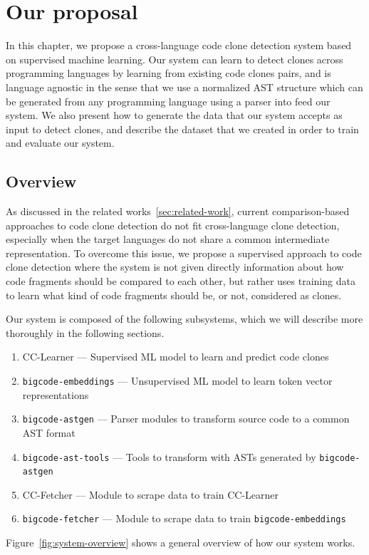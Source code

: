 \chapter{\label{ch:proposal}Our proposal}
In this chapter, we propose a cross-language code clone detection system based
on supervised machine learning. Our system can learn to detect clones across
programming languages by learning from existing code clones pairs, and is
language agnostic in the sense that we use a normalized AST structure which can
be generated from any programming language using a parser into feed our system.
We also present how to generate the data that our system accepts as input to
detect clones, and describe the dataset that we created in order to train and
evaluate our system.
%
\section{\label{sec:proposal-overview}Overview}
As discussed in the related works~\ref{sec:related-work}, current
comparison-based approaches to code clone detection do not fit cross-language
clone detection, especially when the target languages do not share a common
intermediate representation.
To overcome this issue, we propose a supervised approach to code clone detection
where the system is not given directly information about how code fragments
should be compared to each other, but rather uses training data to learn what
kind of code fragments should be, or not, considered as clones.

Our system is composed of the following subsystems, which we will describe more
thoroughly in the following sections.
\begin{enumerate}
\item\label{it:sup-model} CC-Learner --- Supervised ML model to learn and predict code clones
\item\label{it:unsup-model} \lstinline{bigcode-embeddings} --- Unsupervised ML
  model to learn token vector representations
\item\label{it:bigcode-astgen} \lstinline{bigcode-astgen} --- Parser modules to
  transform source code to a common AST format
\item\label{it:bigcode-ast-tools} \lstinline{bigcode-ast-tools} --- Tools to
  transform with ASTs generated by \lstinline{bigcode-astgen}
\item\label{it:sup-scraper} CC-Fetcher --- Module to scrape data to train CC-Learner
\item\label{it:unsup-scraper} \lstinline{bigcode-fetcher} --- Module to scrape data to train \lstinline{bigcode-embeddings}
\end{enumerate}
Figure~\ref{fig:system-overview} shows a general overview of how our system
works.

